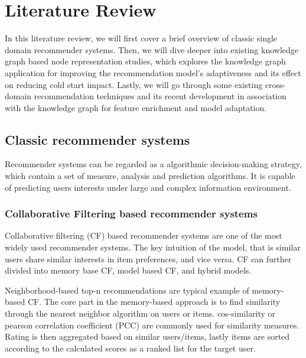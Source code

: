 \section{Literature Review}
In this literature review, we will first cover a brief overview of classic single domain recommender systems. Then, we will dive deeper into existing knowledge graph based node representation studies, which explores the knowledge graph application for improving the recommendation model's adaptiveness and its effect on reducing cold start impact. Lastly, we will go through some existing cross-domain recommendation techniques and its recent development in association with the knowledge graph for feature enrichment and model adaptation.

\subsection{Classic recommender systems}
Recommender systems can be regarded as a algorithmic decision-making strategy, which contain a set of measure, analysis and prediction algorithms. It is capable of predicting users interests under large and complex information environment.

\bigskip
\subsubsection{Collaborative Filtering based recommender systems}
Collaborative filtering (CF) based recommender systems are one of the most widely used recommender systems. The key intuition of the model, that is similar users share similar interests in item preferences, and vice versa. CF can further divided into memory base CF, model based CF, and hybrid models.

Neighborhood-based top-n recommendations are typical example of memory-based CF. The core part in the memory-based approach is to find similarity through the nearest neighbor algorithm on users or items. cos-similarity or pearson correlation coefficient (PCC) \citep{sarwar2001item} are commonly used for similarity measures. Rating is then aggregated based on similar users/items, lastly items are sorted according to the calculated scores as a ranked list for the target user. 

